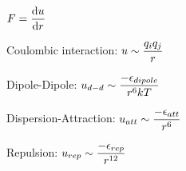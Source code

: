 \begin{bigmdframed}

    
    \begin{listone}
    
      \item $\force = \dfrac{\mathrm{d}\forcepot}{\mathrm{d}\pos}$

      \item Coulombic interaction: $\forcepot \sim \dfrac{\charge{i} \charge{j}}{\pos}$

      \item Dipole-Dipole: $\forcepot_{d-d} \sim \dfrac{-\dielec_{dipole}}{\pos^6\thermcond\Temp}$

      \item Dispersion-Attraction: $\forcepot_{att} \sim \dfrac{-\dielec_{att}}{\pos^6}$

      \item Repulsion: $\forcepot_{rep} \sim \dfrac{-\dielec_{rep}}{\pos^{12}}$
    
    \end{listone}
 
\end{bigmdframed}